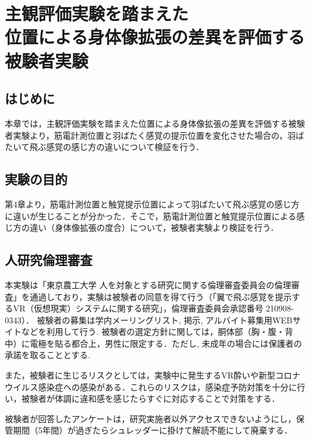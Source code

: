 \chapter[
        位置による身体像拡張の差異を評価する被験者実験]{主観評価実験を踏まえた\\位置による身体像拡張の差異を評価する\\被験者実験}

\section{はじめに}
        本章では，主観評価実験を踏まえた位置による身体像拡張の差異を評価する被験者実験より，筋電計測位置と羽ばたく感覚の提示位置を変化させた場合の，羽ばたいて飛ぶ感覚の感じ方の違いについて検証を行う．

\section{実験の目的}
        第4章より，筋電計測位置と触覚提示位置によって羽ばたいて飛ぶ感覚の感じ方に違いが生じることが分かった．そこで，筋電計測位置と触覚提示位置による感じ方の違い（身体像拡張の度合）について，被験者実験より検証を行う．
        
\section{人研究倫理審査}
        本実験は「東京農工大学 人を対象とする研究に関する倫理審査委員会の倫理審査」を通過しており，実験は被験者の同意を得て行う（「翼で飛ぶ感覚を提示するVR（仮想現実）システムに関する研究」，倫理審査委員会承認番号 210908-0343）．
        被験者の募集は学内メーリングリスト, 掲示, アルバイト募集用WEBサイトなどを利用して行う. 被験者の選定方針に関しては，胴体部（胸・腹・背中）に電極を貼る都合上，男性に限定する．ただし, 未成年の場合には保護者の承諾を取ることとする. 

        また，被験者に生じるリスクとしては，実験中に発生するVR酔いや新型コロナウイルス感染症への感染がある．これらのリスクは，感染症予防対策を十分に行い，被験者が体調に違和感を感じたらすぐに対応することで対策をする．

        被験者が回答したアンケートは，研究実施者以外アクセスできないようにし，保管期間（5年間）が過ぎたらシュレッダーに掛けて解読不能にして廃棄する．
        

